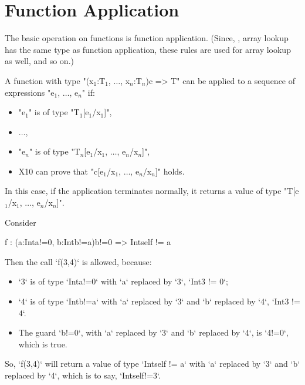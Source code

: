\section{Function Application}
\label{sect:FunctionApplication}

The basic operation on functions is function application.  
(Since, \eg, array lookup has the same type as function application, these
rules are used for array lookup as well, and so on.) 

A function with type 
\xcdmath"(x$_1$:T$_1$, $\ldots$, x$_n$:T$_n$){c} => T"
can be applied to a sequence of expressions 
\xcdmath"e$_1$, $\ldots$, e$_n$"
if: 
\begin{itemize}
\item \xcdmath"e$_1$" is of type \xcdmath"T$_1$[e$_1$/x$_1$]",
\item $\ldots$,
\item \xcdmath"e$_n$" is of type 
      \xcdmath"T$_n$[e$_1$/x$_1$, $\ldots$, e$_n$/x$_n$]",
\item X10 can prove that \xcdmath"c[e$_1$/x$_1$, $\ldots$, e$_n$/x$_n$]" holds.
\end{itemize}
\noindent
In this case, if the application terminates normally, it returns a
value of type 
\xcdmath"T[e$_1$/x$_1$, $\ldots$, e$_n$/x$_n$]".

\begin{ex}
Consider
\begin{xten}
 f : (a:Int{a!=0}, b:Int{b!=a}){b!=0} => Int{self != a}
\end{xten}

Then the call \xcd`f(3,4)` is allowed, because: 
\begin{itemize}
\item \xcd`3` is of type \xcd`Int{a!=0}` with \xcd`a` replaced by \xcd`3`, 
\viz{}  \xcd`Int{3 != 0}`; 
\item \xcd`4` is of type \xcd`Int{b!=a}` 
with \xcd`a` replaced by \xcd`3` and 
\xcd`b` replaced by \xcd`4`, 
\viz{} \xcd`Int{3 != 4}`. 
\item The guard \xcd`b!=0`, 
with \xcd`a` replaced by \xcd`3` and 
\xcd`b` replaced by \xcd`4`, 
is \xcd`4!=0`, which is true.  
\end{itemize}
So, \xcd`f(3,4)` will return a value of type 
\xcd`Int{self != a}` with 
 \xcd`a` replaced by \xcd`3` and 
\xcd`b` replaced by \xcd`4`, 
which is to say, \xcd`Int{self!=3}`.
\end{ex}


